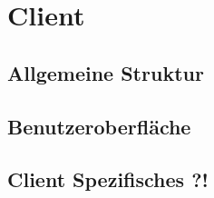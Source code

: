 \chapter{Client}

\section{Allgemeine Struktur}
\section{Benutzeroberfläche}
\section{Client Spezifisches ?!}

